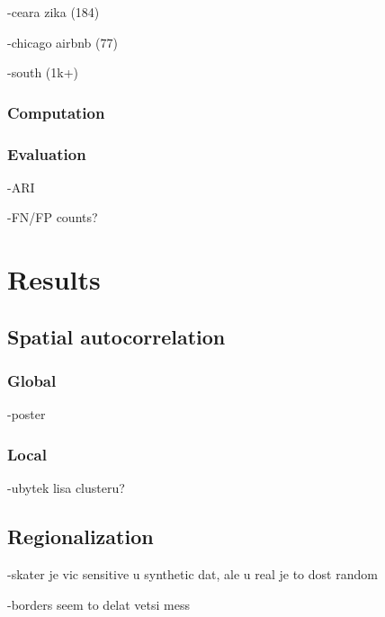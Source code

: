 \documentclass[
  english,
  12pt,
  a4paper,
]{article}
\renewcommand{\refname}{Reference}
\let\thesisbibliography
\renewcommand{}[1]{%
  \setstretch{1}%
  \addcontentsline{toc}{section}{Reference}%
  \thesisbibliography{#1}%
}
\begin{document}
-ceara zika (184)

-chicago airbnb (77)

-south (1k+)

\subsubsection{Computation}\label{computation-1}

\subsubsection{Evaluation}\label{evaluation-1}

-ARI

-FN/FP counts?

\section{Results}\label{results}

\subsection{Spatial autocorrelation}\label{spatial-autocorrelation-1}

\subsubsection{Global}\label{global}

-poster

\subsubsection{Local}\label{local}

-ubytek lisa clusteru?

\subsection{Regionalization}\label{regionalization-1}

-skater je vic sensitive u synthetic dat, ale u real je to dost random

-borders seem to delat vetsi mess

\renewcommand\refname{Discussion}

\end{document}
